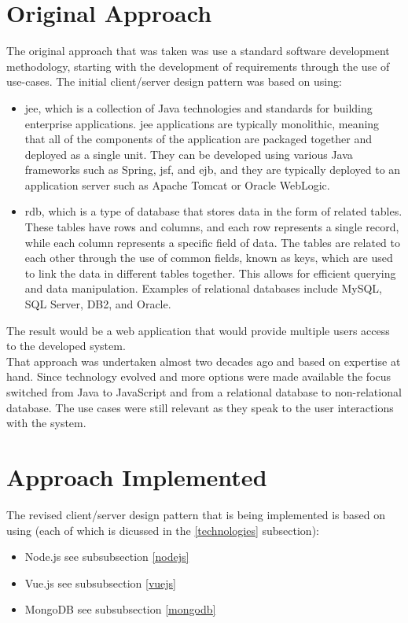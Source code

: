 \section{Original Approach}
The original approach that was taken was use a standard software development methodology, starting with the development of requirements through the use of use-cases. The initial client/server design pattern was based on using:
\begin{itemize}
\item \gls{jee}, which is a collection of Java technologies and standards for building enterprise applications. \gls{jee} applications are typically monolithic, meaning that all of the components of the application are packaged together and deployed as a single unit. They can be developed using various Java frameworks such as Spring, \gls{jsf}, and \gls{ejb}, and they are typically deployed to an application server such as Apache Tomcat or Oracle WebLogic.
\item \gls{rdb}, which is a type of database that stores data in the form of related tables. These tables have rows and columns, and each row represents a single record, while each column represents a specific field of data. The tables are related to each other through the use of common fields, known as keys, which are used to link the data in different tables together. This allows for efficient querying and data manipulation. Examples of relational databases include MySQL, SQL Server, DB2, and Oracle.
\end{itemize}
The result would be a web application that would provide multiple users access to the developed system.\vspace{5mm} \\
That approach was undertaken almost two decades ago and based on expertise at hand. Since technology evolved and more options were made available the focus switched from Java to JavaScript and from a relational database to non-relational database. The use cases were still relevant as they speak to the user interactions with the system.
\section{Approach Implemented}
The revised client/server design pattern that is being implemented is based on using (each of which is dicussed in the \ref{technologies}  subsection):
\begin{itemize}
\item Node.js see subsubsection \ref{nodejs}
\item Vue.js see subsubsection \ref{vuejs}
\item MongoDB see subsubsection \ref{mongodb}
\end{itemize}
